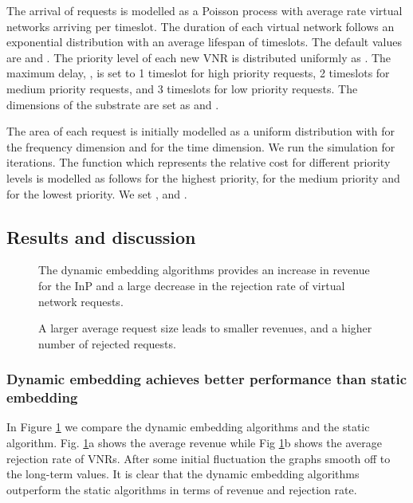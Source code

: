 \documentclass[conference]{IEEEtran}
\begin{document}
The arrival of requests is modelled as a Poisson process with average rate  virtual networks arriving per timeslot. The duration of each virtual network follows an exponential distribution with an average lifespan of  timeslots. The default values are  and . The priority level of each new VNR is distributed uniformly as . The maximum delay, , is set to 1 timeslot for high priority requests, 2 timeslots for medium priority requests, and 3 timeslots for low priority requests. The dimensions of the substrate are set as  and .

The area of each request is initially modelled as a uniform distribution with  for the frequency dimension and  for the time dimension. We run the simulation for  iterations. The function  which represents the relative cost for different priority levels is modelled as follows  for the highest priority,  for the medium priority and  for the lowest priority. We set ,  and .

\subsection{Results and discussion}

\begin{figure}[!t]
\centering
  \hfill
  \hfill
  \caption{The dynamic embedding algorithms provides an increase in revenue for the InP and a large decrease in the rejection rate of virtual network requests.}\label{fig:3}
\end{figure}

\begin{figure}[!t]
\centering
 \hfill
  \hfill
  \caption{A larger average request size leads to smaller revenues, and a higher number of rejected requests.}\label{fig:5}

\end{figure}



\subsubsection{Dynamic embedding achieves better performance than static embedding}In Figure \ref{fig:3} we compare the dynamic embedding algorithms and the static algorithm. Fig. \ref{fig:3}a shows the average revenue while Fig \ref{fig:3}b shows the average rejection rate of VNRs. After some initial fluctuation the graphs smooth off to the long-term values. It is clear that the dynamic embedding algorithms outperform the static algorithms in terms of revenue and rejection rate.
\end{document}
